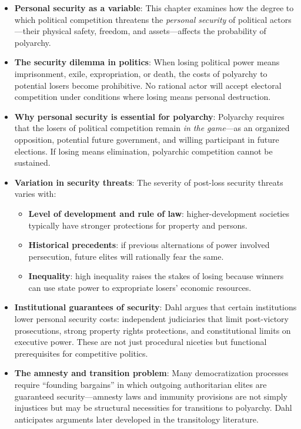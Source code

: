 \documentclass[12pt]{article}
\begin{document}
\begin{itemize}[leftmargin=*, itemsep=4pt]
    \item \textbf{Personal security as a variable}: This chapter examines how the degree to which political competition threatens the \emph{personal security} of political actors---their physical safety, freedom, and assets---affects the probability of polyarchy.
    \item \textbf{The security dilemma in politics}: When losing political power means imprisonment, exile, expropriation, or death, the costs of polyarchy to potential losers become prohibitive. No rational actor will accept electoral competition under conditions where losing means personal destruction.
    \item \textbf{Why personal security is essential for polyarchy}: Polyarchy requires that the losers of political competition remain \emph{in the game}---as an organized opposition, potential future government, and willing participant in future elections. If losing means elimination, polyarchic competition cannot be sustained.
    \item \textbf{Variation in security threats}: The severity of post-loss security threats varies with:
        \begin{itemize}
            \item \textbf{Level of development and rule of law}: higher-development societies typically have stronger protections for property and persons.
            \item \textbf{Historical precedents}: if previous alternations of power involved persecution, future elites will rationally fear the same.
            \item \textbf{Inequality}: high inequality raises the stakes of losing because winners can use state power to expropriate losers' economic resources.
        \end{itemize}
    \item \textbf{Institutional guarantees of security}: Dahl argues that certain institutions lower personal security costs: independent judiciaries that limit post-victory prosecutions, strong property rights protections, and constitutional limits on executive power. These are not just procedural niceties but functional prerequisites for competitive politics.
    \item \textbf{The amnesty and transition problem}: Many democratization processes require ``founding bargains'' in which outgoing authoritarian elites are guaranteed security---amnesty laws and immunity provisions are not simply injustices but may be structural necessities for transitions to polyarchy. Dahl anticipates arguments later developed in the transitology literature.

\end{itemize}
\end{document}
